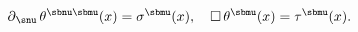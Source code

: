 \begin{equation} \label{6.1}
\partial{}_{\snu} \, \theta^{\sbnu \sbmu}(x) = \sigma^{\sbmu}(x), \quad
\square  \, \theta^{\sbmu}(x)  =  \tau^{\sbmu}(x). 
\end{equation}

